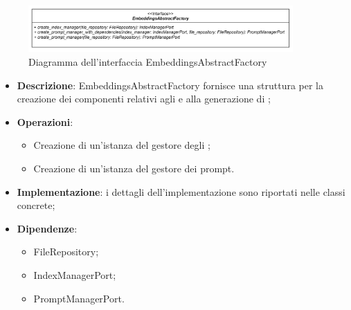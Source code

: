 
 \label{EmbeddingsAbstractFactory}
\begin{figure}[H]
    \centering
    \includegraphics[width=0.9\textwidth]{assets/Backend/embeddings_abstract_factory.png}
    \caption{Diagramma dell'interfaccia EmbeddingsAbstractFactory}
  \end{figure}
\begin{itemize}
    \item \textbf{Descrizione}: EmbeddingsAbstractFactory fornisce una struttura per la creazione dei componenti relativi agli  e alla generazione di ;
    \item \textbf{Operazioni}:
    \begin{itemize}
      \item Creazione di un'istanza del gestore degli ;
      \item Creazione di un'istanza del gestore dei prompt.
    \end{itemize}
    \item \textbf{Implementazione}: i dettagli dell'implementazione sono riportati nelle classi concrete;
    \item \textbf{Dipendenze}:
    \begin{itemize}
        \item FileRepository;
        \item IndexManagerPort;
        \item PromptManagerPort.
    \end{itemize}
\end{itemize}  


